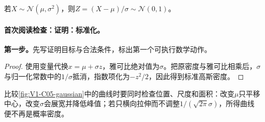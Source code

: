 \documentclass[UTF8,a4paper,11pt,openany]{ctexbook}
\begin{document}
\setcounter{page}{79}
\setcounter{chapter}{5}
\setcounter{figure}{0}
\pagestyle{headings}
\begin{lemma}[标准化]
若$X\sim\mathcal N(\mu,\sigma^2)$，则$Z=(X-\mu)/\sigma\sim\mathcal N(0,1)$。
\end{lemma}
\paragraph{首次阅读检查：证明：标准化。}\textbf{第一步。}先写证明目标与合法条件，标出第一个可执行数学动作。
\begin{proof}
使用变量代换$x=\mu+\sigma z$，雅可比绝对值为$\sigma$。把原密度与雅可比相乘后，$\sigma$与归一化常数中的$1/\sigma$抵消，指数项化为$-z^2/2$，因此得到标准高斯密度。
\end{proof}

比较\cref{fig:V1-C05-gaussian}中的曲线时要同时检查位置、尺度和面积：改变$\mu$只平移中心，改变$\sigma$会展宽并降低峰值；若只横向拉伸而不调整$1/(\sqrt{2\pi}\sigma)$，所得曲线便不再是概率密度。
\end{document}
